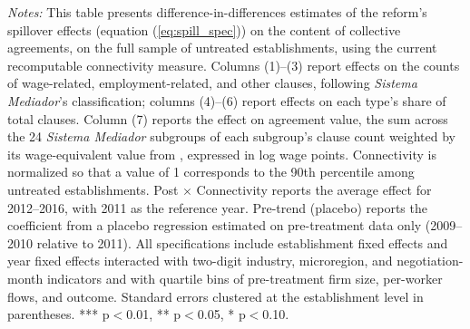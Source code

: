 \documentclass[11pt]{article}
\begin{document}
\begin{table}[H]
\begin{minipage}{\linewidth}
    \textit{Notes:} This table presents difference-in-differences estimates of the reform's spillover effects (equation (\ref{eq:spill_spec})) on the content of collective agreements, on the full sample of untreated establishments, using the current recomputable connectivity measure. Columns (1)--(3) report effects on the counts of wage-related, employment-related, and other clauses, following \textit{Sistema Mediador}'s classification; columns (4)--(6) report effects on each type's share of total clauses. Column (7) reports the effect on agreement value, the sum across the 24 \textit{Sistema Mediador} subgroups of each subgroup's clause count weighted by its wage-equivalent value from \citet{Lagos2026}, expressed in log wage points. Connectivity is normalized so that a value of 1 corresponds to the 90th percentile among untreated establishments. Post $\times$ Connectivity reports the average effect for 2012--2016, with 2011 as the reference year. Pre-trend (placebo) reports the coefficient from a placebo regression estimated on pre-treatment data only (2009--2010 relative to 2011). All specifications include establishment fixed effects and year fixed effects interacted with two-digit industry, microregion, and negotiation-month indicators and with quartile bins of pre-treatment firm size, per-worker flows, and outcome. Standard errors clustered at the establishment level in parentheses. *** p$<$0.01, ** p$<$0.05, * p$<$0.10.
\end{minipage}
\end{table}
\end{document}
